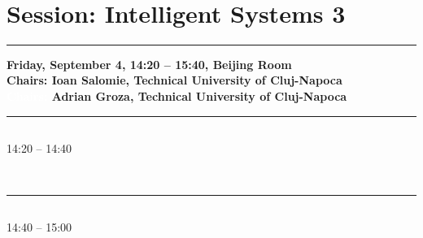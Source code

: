             
            \\ 



\section{{\bf \large Session: 
Intelligent Systems 3 
}}\vspace{-15pt} %
\noindent\rule{\textwidth}{0.4pt} \nopagebreak
{\bf  
Friday, September 4, 14:20 -- 15:40, Beijing Room
} \\ \nopagebreak
{\bf  Chairs: 
Ioan Salomie, Technical University of Cluj-Napoca
} \\ \nopagebreak
{\bf  \textcolor{white}{Chairs:} 
Adrian Groza,  Technical University of Cluj-Napoca
} \\ \nopagebreak
\noindent\rule{\textwidth}{0.4pt}\nopagebreak

\vspace*{-36pt}\subsection[ 
    	   {\bf M2O: A Library for Using Ontologies in Software Engineering
           } \\
           {\it Claudia Pop, Dorin Moldovan, Marcel Antal, Dan Valea, Tudor Cioara, Ionut Anghel, Ioan Salomie
           }
	]
	    {
            }
	    14:20 -- 14:40 \nopagebreak
	    
            
            \\ 
            \noindent\rule{\textwidth}{0.4pt}
\vspace*{-36pt}\subsection[ 
    	   {\bf Tools for Mapping Ontologies to Relational Databases: A Comparative Evaluation
           } \\
           {\it Dorin Moldovan, Marcel Antal, Dan Valea, Claudia Pop, Tudor Cioara, Ionut Anghel, Ioan Salomie
           }
	]
	    {
            }
	    14:40 -- 15:00 \nopagebreak
	    
